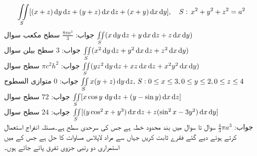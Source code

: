 \begin{align*}\iint\limits_S [(x+z)\dif y \dif z+(y+z)\dif x\dif z+(x+y)\dif x\dif y],\quad S:\, x^2+y^2+z^2=a^2\end{align*}
جواب:\quad
$\tfrac{8\pi a^3}{3}$
\quad سطح مکعب سوال \quad 
$\iint\limits_S (x\dif y \dif z+y\dif x\dif z+z\dif x\dif y)$\\
جواب:\quad
$3$
\quad سطح بیلن سوال \quad 
$\iint\limits_S (x^2\dif y \dif z+y^2\dif x\dif z+z^2\dif x\dif y)$\\
جواب:\quad
$\pi c^2h^2$
\quad سطح سوال \quad
$\iint\limits_S (yz^2\dif y \dif z+xz\dif x\dif z+x^2y^2\dif x\dif y)$\\
جواب:\quad
$0$
\quad متوازی السطوح
$\iint\limits_S x(y+z)\dif y \dif z,\, S:0\le x \le 3, 0\le y \le 2,0\le z \le 4\,\,$\\
جواب:\quad
$72$
\quad سطح سوال 
$\iint\limits_S [x\cos y\,\dif y \dif z+(y-\sin y)\dif x\dif z]\,\,$\\
جواب:\quad
$24$
\quad سطح سوال 
$\iint\limits_S [(y\cos^2 x+y^3)\dif x\dif z+z(\sin^2 x-3y^2)\dif x\dif y]$\\
جواب:\quad
$\tfrac{4}{3}\pi a^3$
سوال  تا سوال  میں  بند محدود خطہ ہے جس کی سرحدی سطح  ہے۔مسئلہ انفراج استعمال کرتے ہوئے دیے  گئے فقرے ثابت کریں جہاں  سے مراد لاپلاس مساوات کا حل ہے جس کے  میں استمراری دو رتبی جزوی تفرق پائے جاتے ہوں۔

